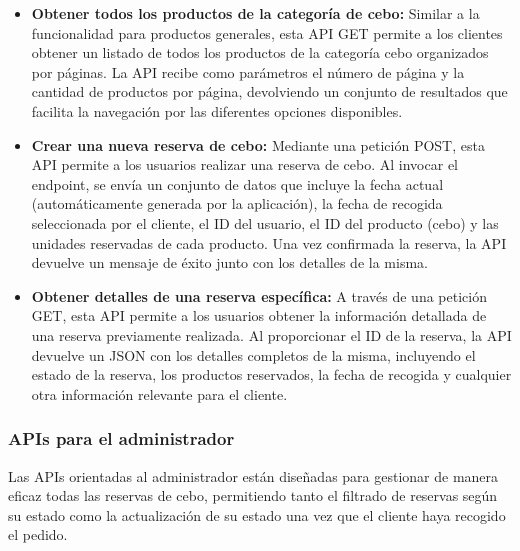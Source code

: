 \begin{itemize}

     \item \textbf{Obtener todos los productos de la categoría de cebo:} Similar a la funcionalidad para productos generales, esta API GET permite a los clientes obtener un listado de todos los productos de la categoría cebo organizados por páginas. La API recibe como parámetros el número de página y la cantidad de productos por página, devolviendo un conjunto de resultados que facilita la navegación por las diferentes opciones disponibles.
     
    \item \textbf{Crear una nueva reserva de cebo:} Mediante una petición POST, esta API permite a los usuarios realizar una reserva de cebo. Al invocar el endpoint, se envía un conjunto de datos que incluye la fecha actual (automáticamente generada por la aplicación), la fecha de recogida seleccionada por el cliente, el ID del usuario, el ID del producto (cebo) y las unidades reservadas de cada producto. Una vez confirmada la reserva, la API devuelve un mensaje de éxito junto con los detalles de la misma.
    
    \item \textbf{Obtener detalles de una reserva específica:} A través de una petición GET, esta API permite a los usuarios obtener la información detallada de una reserva previamente realizada. Al proporcionar el ID de la reserva, la API devuelve un JSON con los detalles completos de la misma, incluyendo el estado de la reserva, los productos reservados, la fecha de recogida y cualquier otra información relevante para el cliente.


\end{itemize}

\vspace{0.5cm}

\subsubsection{APIs para el administrador}\label{subsec5.3.3.2}

Las APIs orientadas al administrador están diseñadas para gestionar de manera eficaz todas las reservas de cebo, permitiendo tanto el filtrado de reservas según su estado como la actualización de su estado una vez que el cliente haya recogido el pedido.

